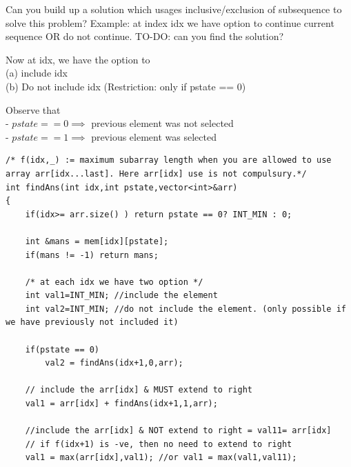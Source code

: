 \begin{solution}
    Can you build up a solution which usages inclusive/exclusion of subsequence to solve this problem?
    Example: at index idx we have option to continue current sequence OR do not continue.
    TO-DO: can you find the solution?



    Now at idx, we have the option to \\
    (a) include idx\\
    (b) Do not include idx (Restriction: only if pstate == 0)

    Observe that \\
    - $pstate==0 \implies$ previous element was not selected\\
    - $pstate==1 \implies$ previous element was selected


    \begin{minipage}{\textwidth}
    \begin{lstlisting}
/* f(idx,_) := maximum subarray length when you are allowed to use array arr[idx...last]. Here arr[idx] use is not compulsury.*/
int findAns(int idx,int pstate,vector<int>&arr)
{
    if(idx>= arr.size() ) return pstate == 0? INT_MIN : 0; 

    int &mans = mem[idx][pstate];
    if(mans != -1) return mans;
    
    /* at each idx we have two option */
    int val1=INT_MIN; //include the element 
    int val2=INT_MIN; //do not include the element. (only possible if we have previously not included it)

    if(pstate == 0)
        val2 = findAns(idx+1,0,arr);
    
    // include the arr[idx] & MUST extend to right
    val1 = arr[idx] + findAns(idx+1,1,arr); 

    //include the arr[idx] & NOT extend to right = val11= arr[idx]
    // if f(idx+1) is -ve, then no need to extend to right
    val1 = max(arr[idx],val1); //or val1 = max(val1,val11);


\end{lstlisting}
\end{minipage}
\end{solution}
